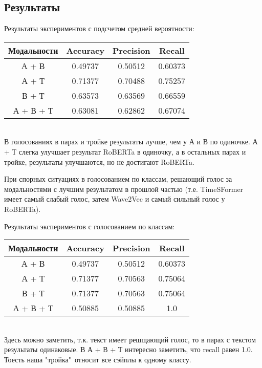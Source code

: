\documentclass[PMI,KR]{HSEUniversity}
\begin{document}
\subsection{Результаты}

Результаты экспериментов с подсчетом средней вероятности: \\

\begin{center}
\begin{tabular}{ |c||c|c|c| }
     \hline
      Модальности & Accuracy & Precision & Recall \\
     \hline
      А + В & 0.49737 & 0.50512 & 0.60373 \\
      А + Т & 0.71377 & 0.70488 & 0.75257 \\
      В + Т & 0.63573 & 0.63569 & 0.66559 \\
      А + В + Т & 0.63081 & 0.62862 & 0.67074 \\
     \hline
\end{tabular} 
\end{center} \\

В голосованиях в парах и тройке результаты лучше, чем у А и В по одиночке.
А + Т слегка улучшает результат RoBERTa в одиночку, а в остальных парах и тройке, результаты улучшаются, но не достигают RoBERTa.


При спорных ситуациях в голосованием по классам, решающий голос за модальностями с лучшим результатом в прошлой частью (т.е. TimeSFormer имеет самый слабый голос, затем Wave2Vec и самый сильный голос у RoBERTa).

Результаты экспериментов с голосованием по классам: \\

\begin{center}
\begin{tabular}{ |c||c|c|c|}
     \hline
      Модальности & Accuracy & Precision & Recall \\
     \hline
      А + В & 0.49737 & 0.50512 & 0.60373 \\
      А + Т & 0.71377 & 0.70563 & 0.75064 \\
      В + Т & 0.71377 & 0.70563 & 0.75064 \\
      А + В + Т & 0.50885 & 0.50885 & 1.0 \\
    \hline
\end{tabular}
\end{center} \\

Здесь можно заметить, т.к. текст имеет решщающий голос, то в парах с текстом результаты одинаковые. 
В А + В + Т интересно заметить, что recall равен 1.0. Тоесть наша "тройка"\ относит все сэйплы к одному классу.
\end{document}

